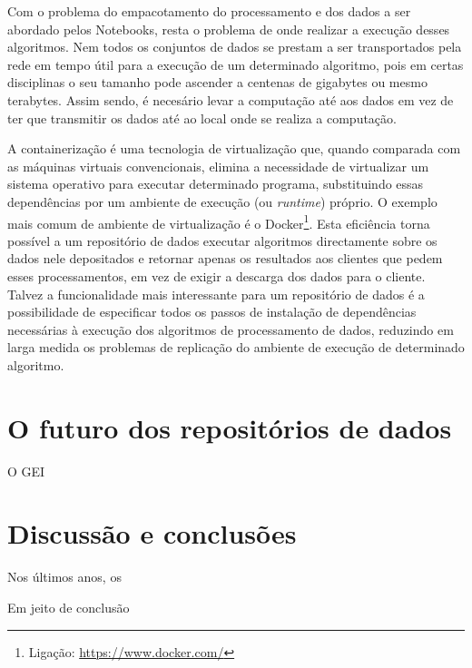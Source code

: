 \documentclass[sigconf,nonacm]{acmart}
\begin{document}
Com o problema do empacotamento do processamento e dos dados a ser abordado pelos Notebooks, resta o problema de onde realizar a execução desses algoritmos. Nem todos os conjuntos de dados se prestam a ser transportados pela rede em tempo útil para a execução de um determinado algoritmo, pois em certas disciplinas o seu tamanho pode ascender a centenas de gigabytes ou mesmo terabytes. Assim sendo, é necesário levar a computação até aos dados em vez de ter que transmitir os dados até ao local onde se realiza a computação. 

A containerização é uma tecnologia de virtualização que, quando comparada com as máquinas virtuais convencionais, elimina a necessidade de virtualizar um sistema operativo para executar determinado programa, substituindo essas dependências por um ambiente de execução (ou \textit{runtime}) próprio. O exemplo mais comum de ambiente de virtualização é o Docker\footnote{Ligação: \url{https://www.docker.com/}}. Esta eficiência torna possível a um repositório de dados executar algoritmos directamente sobre os dados nele depositados e retornar apenas os resultados aos clientes que pedem esses processamentos, em vez de exigir a descarga dos dados para o cliente. Talvez a funcionalidade mais interessante para um repositório de dados é a possibilidade de especificar todos os passos de instalação de dependências necessárias à execução dos algoritmos de processamento de dados, reduzindo em larga medida os problemas de replicação do ambiente de execução de determinado algoritmo. 

\section{O futuro dos repositórios de dados}

O GEI 

\section{Discussão e conclusões}

Nos últimos anos, os 

Em jeito de conclusão





\end{document}
